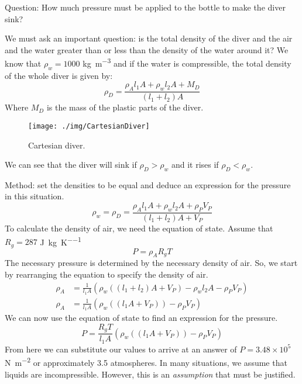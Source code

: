 Question: How much pressure must be applied to the bottle to make the diver sink?

We must ask an important question: is the total density of the diver and the air and the water greater than or less than the density of the water around it? We know that \( \rho_w = 1000\) \si{kg\per\meter\cubed} and if the water is compressible, the total density of the whole diver is given by:
\begin{equation}
  \rho_D = \frac{\rho_A l_1 A + \rho_w l_2 A + M_D}{(l_1 + l_2)A}
\end{equation}
Where \(M_D\) is the mass of the plastic parts of the diver.
\begin{figure}[h!]
  \centering
  \texttt{[image: ./img/CartesianDiver]}
  \caption{Cartesian diver.}
\end{figure}
We can see that the diver will sink if \(\rho_D > \rho_w\) and it rises if \(\rho_D < \rho_w\).

Method: set the densities to be equal and deduce an expression for the pressure in this situation.
\begin{equation}
  \rho_w = \rho_D = \frac{\rho_A l_1 A + \rho_w l_2 A + \rho_P V_P}{(l_1 + l_2)A + V_P}
\end{equation}
To calculate the density of air, we need the equation of state. Assume that \( R_g = 287\) \si{\joule\per\kg\per\kelvin}
\begin{equation}
  P = \rho_A R_g T
\end{equation}
The necessary pressure is determined by the necessary density of air. So, we start by rearranging the equation to specify the density of air.
\begin{align}
  \rho_A & = \frac{1}{l_1 A} \left( \rho_w \left( (l_1 + l_2)A + V_P \right) - \rho_w l_2 A - \rho_P V_P \right) \\
  \rho_A & = \frac{1}{l_1 A} \left( \rho_w \left( (l_1A + V_P) \right) -\rho_P V_P \right)
\end{align}
We can now use the equation of state to find an expression for the pressure.
\begin{equation}
  P = \frac{R_g T}{l_1 A} \left( \rho_w \left( (l_1A + V_P) \right) -\rho_P V_P \right)
\end{equation}
From here we can substitute our values to arrive at an answer of \( P = 3.48 \times 10^5\) \si{\newton\per\meter\squared} or approximately 3.5 atmospheres. In many situations, we assume that liquids are incompressible. However, this is an \emph{assumption} that must be justified.
